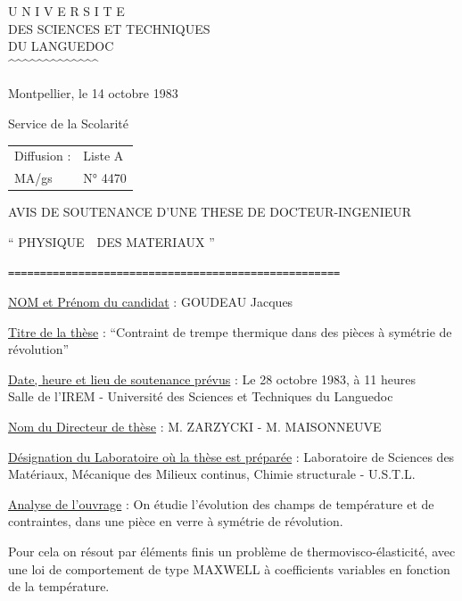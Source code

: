 
\noindent
\begin{minipage}[t]{0.44\linewidth}
\centering
U N I V E R S I T E\\
DES SCIENCES ET TECHNIQUES\\
DU LANGUEDOC\\
\textasciicircum\textasciicircum\textasciicircum\textasciicircum\textasciicircum\textasciicircum\textasciicircum\textasciicircum\textasciicircum\textasciicircum\textasciicircum\textasciicircum\textasciicircum
\end{minipage}\hfill
\begin{minipage}[t]{0.53\linewidth}
\raggedleft
\vspace{\baselineskip}
Montpellier, le 14 octobre 1983
\end{minipage}

Service de la Scolarité

\begin{tabular}{@{}ll@{}}
Diffusion : & Liste A\\
MA/gs & N° 4470
\end{tabular}

\begin{center}
AVIS DE SOUTENANCE D'UNE THESE DE DOCTEUR-INGENIEUR

`` PHYSIQUE\ \ DES MATERIAUX ''

\texttt{====================================================}
\end{center}

\uline{NOM et Prénom du candidat} : GOUDEAU Jacques

\uline{Titre de la thèse} : ``Contraint de trempe thermique dans des pièces à symétrie de révolution''

\uline{Date, heure et lieu de soutenance prévus} : Le 28 octobre 1983, à 11 heures\\
Salle de l'IREM - Université des Sciences et Techniques du Languedoc

\uline{Nom du Directeur de thèse} : M. ZARZYCKI - M. MAISONNEUVE

\uline{Désignation du Laboratoire où la thèse est préparée} : Laboratoire de Sciences des Matériaux, Mécanique des Milieux continus, Chimie structurale - U.S.T.L.

\uline{Analyse de l'ouvrage} : On étudie l'évolution des champs de température et de contraintes, dans une pièce en verre à symétrie de révolution.

Pour cela on résout par éléments finis un problème de thermovisco-élasticité, avec une loi de comportement de type MAXWELL à coefficients variables en fonction de la température.

